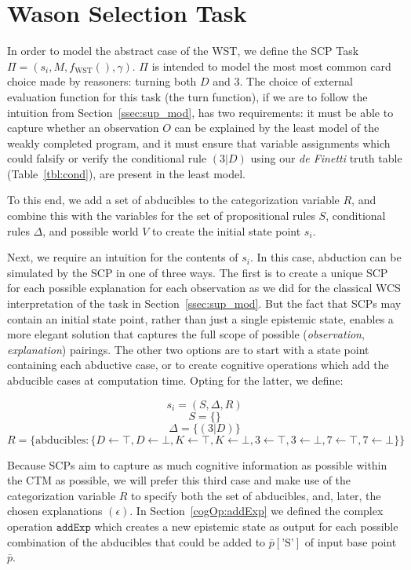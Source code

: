 \section{Wason Selection Task}\label{sec:wstSCP}



In order to model the abstract case of the WST, we define the SCP Task $\Pi=(s_i,M,f_\text{WST}(),\gamma)$. $\Pi$ is intended to model the most most common card choice made by reasoners: turning both $D$ and $3$. The choice of external evaluation function for this task (the turn function), if we are to follow the intuition from Section~\ref{ssec:sup_mod}, has two requirements: it must be able to capture whether an observation $O$ can be explained by the least model of the weakly completed program, and it must ensure that variable assignments which could falsify or verify the conditional rule $(3|D)$ using our \textit{de Finetti} truth table (Table~\ref{tbl:cond}), are present in the least model. 

To this end, we add a set of abducibles to the categorization variable $R$, and combine this with the variables for the set of propositional rules $S$, conditional rules $\Delta$, and possible world $V$ to create the initial state point $s_i$.

Next, we require an intuition for the contents of $s_i$. In this case, abduction can be simulated by the SCP in one of three ways. The first is to create a unique SCP for each possible explanation for each observation as we did for the classical WCS interpretation of the task in Section~\ref{ssec:sup_mod}. But the fact that SCPs may contain an initial state point, rather than just a single epistemic state, enables a more elegant solution that captures the full scope of possible (\textit{observation}, \textit{explanation}) pairings. The other two options are to start with a state point containing each abductive case, or to create cognitive operations which add the abducible cases at computation time. Opting for the latter, we define:

\[
s_i=(S,\Delta, R)
\]
\[
S=\{\}
\]
\[
\Delta=\{(3|D)\}
\]
\[
R=\{\text{abducibles}:\{D\leftarrow \top, D \leftarrow \bot, K\leftarrow \top, K \leftarrow \bot, 3\leftarrow \top, 3 \leftarrow \bot, 7\leftarrow \top, 7\leftarrow \bot\}\}
\]

Because SCPs aim to capture as much cognitive information as possible within the CTM as possible, we will prefer this third case and make use of the categorization variable $R$ to specify both the set of abducibles, and, later, the chosen explanations $(\epsilon)$. In Section~\ref{cogOp:addExp} we defined the complex operation $\texttt{addExp}$ which creates a new epistemic state as output for each possible combination of the abducibles that could be added to $\bar{p}[\text{'S'}]$ of input base point $\bar{p}$.

